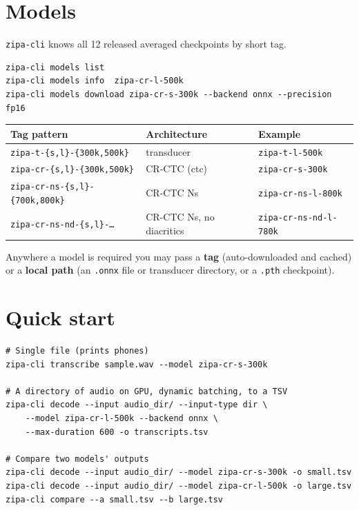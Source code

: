 \documentclass[11pt,a4paper]{article}
\newcommand{\cli}{\texttt{zipa-cli}}
\newcommand{\code}[1]{\texttt{#1}}
\begin{document}
\section{Models}
\cli{} knows all 12 released averaged checkpoints by short tag.

\begin{lstlisting}
zipa-cli models list
zipa-cli models info  zipa-cr-l-500k
zipa-cli models download zipa-cr-s-300k --backend onnx --precision fp16
\end{lstlisting}

\begin{longtable}{@{}lll@{}}
\toprule
\textbf{Tag pattern} & \textbf{Architecture} & \textbf{Example} \\
\midrule
\endhead
\code{zipa-t-\{s,l\}-\{300k,500k\}}    & transducer        & \code{zipa-t-l-500k} \\
\code{zipa-cr-\{s,l\}-\{300k,500k\}}   & CR-CTC (ctc)      & \code{zipa-cr-s-300k} \\
\code{zipa-cr-ns-\{s,l\}-\{700k,800k\}}& CR-CTC Ns         & \code{zipa-cr-ns-l-800k} \\
\code{zipa-cr-ns-nd-\{s,l\}-\dots}     & CR-CTC Ns, no diacritics & \code{zipa-cr-ns-nd-l-780k} \\
\bottomrule
\end{longtable}

Anywhere a model is required you may pass a \textbf{tag} (auto-downloaded and cached)
or a \textbf{local path} (an \code{.onnx} file or transducer directory, or a
\code{.pth} checkpoint).

\section{Quick start}
\begin{lstlisting}
# Single file (prints phones)
zipa-cli transcribe sample.wav --model zipa-cr-s-300k

# A directory of audio on GPU, dynamic batching, to a TSV
zipa-cli decode --input audio_dir/ --input-type dir \
    --model zipa-cr-l-500k --backend onnx \
    --max-duration 600 -o transcripts.tsv

# Compare two models' outputs
zipa-cli decode --input audio_dir/ --model zipa-cr-s-300k -o small.tsv
zipa-cli decode --input audio_dir/ --model zipa-cr-l-500k -o large.tsv
zipa-cli compare --a small.tsv --b large.tsv
\end{lstlisting}
\end{document}
